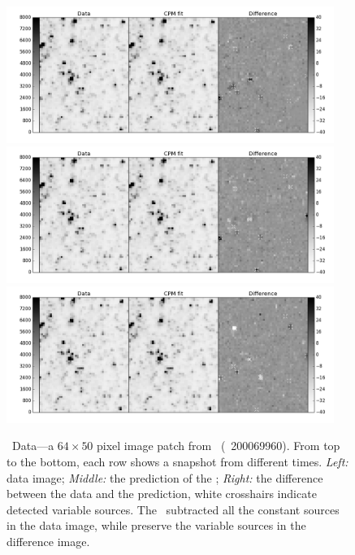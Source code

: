 \begin{figure}[p]
\begin{center}
\includegraphics[width=0.95\textwidth]{figures/cdi/f5a}
\includegraphics[width=0.95\textwidth]{figures/cdi/f5b}
\includegraphics[width=0.95\textwidth]{figures/cdi/f5c}
\end{center}
\caption{
  \label{k2c9}
  \KTCN\ Data---a $64\times 50$ pixel image patch from \KTCN\ (\epic\ 200069960). 
  From top to the bottom,  each row shows a snapshot from different times.
  \emph{Left:} data image;
  \emph{Middle:} the prediction of the \cpmdiff;
  \emph{Right:} the difference between the data and the prediction, white crosshairs indicate detected variable sources.
  The \cpmdiff\ subtracted all the constant sources in the data image, while preserve the variable sources in the difference image.
}
\end{figure}

